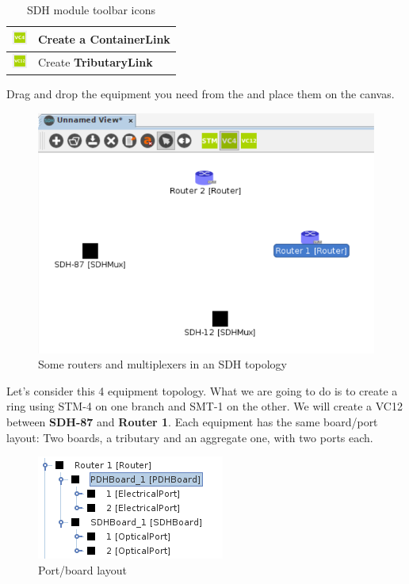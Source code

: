 \documentclass[a4paper]{article}
\begin{document}
\begin{table}[h!]
\begin{tabular}{lp{10cm}}
				\midrule
				\includegraphics[width=0.5cm]{img/sdh_module_container_link.png} & Create a \textbf{ContainerLink} \\
				\midrule
				\includegraphics[width=0.5cm]{img/sdh_module_tributary_link.png} & Create \textbf{TributaryLink} \\
			\end{tabular}
			\caption{SDH module toolbar icons}
			\label{tab:sdh_module_icons}
		\end{table}
		
		Drag and drop the equipment you need from the  and place them on the canvas.
		\begin{figure}[h!]
			\centering
			\includegraphics[width=\linewidth]{img/sdh_module_initial_view.png}
			\caption{Some routers and multiplexers in an SDH topology}
			\label{fig:sdh_module_initial_view}
		\end{figure}
		
		Let's consider this 4 equipment topology. What we are going to do is to create a ring using STM-4 on one branch and SMT-1 on the other. We will create a VC12 between \textbf{SDH-87} and \textbf{Router 1}. Each equipment has the same board/port layout: Two boards, a tributary and an aggregate one, with two ports each.
		\begin{figure}[h!]
			\centering
			\includegraphics[width=0.4\linewidth]{img/sdh_module_layout.png}
			\caption{Port/board layout}
			\label{fig:sdh_module_layout}
		\end{figure}
		
\end{document}
